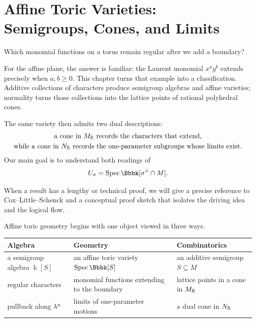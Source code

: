 \chapter[Affine Toric Varieties]
{Affine Toric Varieties:\\ Semigroups, Cones, and Limits}
\label{chap:affine-toric-varieties}

\begin{chapteroverview}
Which monomial functions on a torus remain regular after we add a
boundary?

For the affine plane, the answer is familiar: the Laurent monomial
\(x^ay^b\) extends precisely when \(a,b\geq0\). This chapter turns that
example into a classification. Additive collections of characters
produce semigroup algebras and affine varieties; normality turns those
collections into the lattice points of rational polyhedral cones.

The same variety then admits two dual descriptions:
\[
\begin{array}{c}
\text{a cone in \(M_{\mathbb{R}}\) records the characters that extend,}
\\[1mm]
\text{while a cone in \(N_{\mathbb{R}}\) records the one-parameter
subgroups whose limits exist.}
\end{array}
\]
Our main goal is to understand both readings of
\[
U_\sigma
=
\Spec\Bbbk[\sigma^\vee\cap M].
\]

When a result has a lengthy or technical proof, we will give a precise
reference to Cox--Little--Schenck and a conceptual proof sketch that
isolates the driving idea and the logical flow.
\end{chapteroverview}

\begin{threedictionaries}
Affine toric geometry begins with one object viewed in three ways.

\medskip

\begin{center}
\small
\begin{tabularx}{\linewidth}{@{}
  >{\raggedright\arraybackslash}X
  >{\raggedright\arraybackslash}X
  >{\raggedright\arraybackslash}X@{}}
\toprule
\textbf{Algebra}
&
\textbf{Geometry}
&
\textbf{Combinatorics}
\\
\midrule
a semigroup algebra \(\Bbbk[S]\)
&
an affine toric variety \(\Spec\Bbbk[S]\)
&
an additive semigroup \(S\subseteq M\)
\\[1mm]
regular characters
&
monomial functions extending to the boundary
&
lattice points in a cone in \(M_{\mathbb{R}}\)
\\[1mm]
pullback along \(\lambda^{u}\)
&
limits of one-parameter motions
&
a dual cone in \(N_{\mathbb{R}}\)
\\
\bottomrule
\end{tabularx}
\end{center}
\end{threedictionaries}

